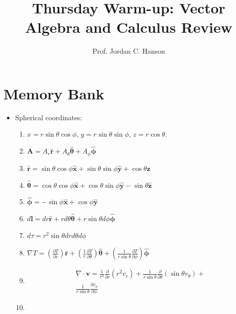 \documentclass[10pt]{article}
\begin{document}
\twocolumn

\title{Thursday Warm-up: Vector Algebra and Calculus Review}
\author{Prof. Jordan C. Hanson}

\maketitle

\section{Memory Bank}

\begin{itemize}
\item Spherical coordinates:
\begin{enumerate}
\item $x=r\sin\theta\cos\phi$, $y=r\sin\theta\sin\phi$, $z=r\cos\theta$.
\item $\mathbf{A} = A_r\hat{\mathbf{r}} + A_\theta\hat{\boldsymbol{\theta}} + A_\phi\hat{\boldsymbol{\phi}}$
\item $\hat{\mathbf{r}}=\sin\theta\cos\phi\hat{\mathbf{x}}+\sin\theta\sin\phi\hat{\mathbf{y}}+\cos\theta\hat{\mathbf{z}}$
\item $\hat{\boldsymbol{\theta}}=\cos\theta\cos\phi\hat{\mathbf{x}}+\cos\theta\sin\phi\hat{\mathbf{y}}-\sin\theta\hat{\mathbf{z}}$
\item $\hat{\boldsymbol{\phi}}=-\sin\phi\hat{\mathbf{x}}+\cos\phi\hat{\mathbf{y}}$
\item $d\mathbf{l}=dr\hat{\mathbf{r}}+rd\theta\hat{\boldsymbol{\theta}}+r\sin\theta d\phi\hat{\boldsymbol{\phi}}$
\item $d\tau = r^2\sin\theta dr d\theta d\phi$
\item $\nabla T = \left(\frac{\partial T}{\partial r}\right)\hat{\mathbf{r}} + \left(\frac{1}{r}\frac{\partial T}{\partial \theta}\right)\hat{\boldsymbol{\theta}} + \left(\frac{1}{r\sin\theta}\frac{\partial T}{\partial \phi}\right)\hat{\boldsymbol{\phi}}$
\item 
\begin{multline}
\nabla \cdot \mathbf{v}=
\frac{1}{r^{2}} \frac{\partial}{\partial r}\left(r^{2} v_{r}\right)+
\frac{1}{r \sin\theta} \frac{\partial}{\partial \theta}\left(\sin\theta v_{\theta}\right)+\\
\frac{1}{r \sin\theta} \frac{\partial v_{\phi}}{\partial \phi}
\end{multline}
\item 
\begin{multline}

\end{multline}
\end{enumerate}
\end{itemize}
\end{document}
